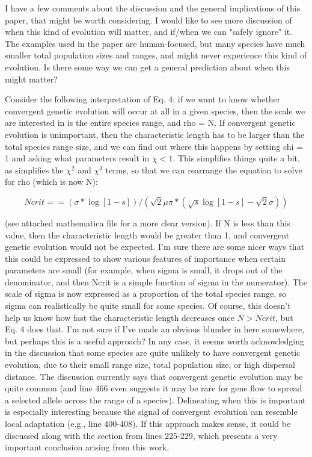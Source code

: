 \documentclass[12pt,letterpaper]{article}
\begin{document}
I have a few comments about the discussion and the general implications of this paper, that might be worth considering. I would like to see more discussion of when this kind of evolution will matter, and if/when we can "safely ignore" it. The examples used in the paper are human-focused, but many species have much smaller total population sizes and ranges, and might never experience this kind of evolution. Is there some way we can get a general prediction about when this might matter?

Consider the following interpretation of Eq. 4: if we want to know whether convergent genetic evolution will occur at all in a given species, then the scale we are interested in is the entire species range, and rho = N. If convergent genetic evolution is unimportant, then the characteristic length has to be larger than the total species range size, and we can find out where this happens by setting chi = 1 and asking what parameters result in $\chi < 1$. This simplifies things quite a bit, as simplifies the $\chi^2$ and $\chi^3$ terms, so that we can rearrange the equation to solve for rho (which is now N):

$$Ncrit == (\sigma * \log[1-s]) / (\sqrt{2}  \mu  \pi * (\sqrt{s} \log[1-s] - \sqrt{2}\sigma) )$$

(see attached mathematica file for a more clear version). If N is less than this value, then the characteristic length would be greater than 1, and convergent genetic evolution would not be expected. I'm sure there are some nicer ways that this could be expressed to show various features of importance when certain parameters are small (for example, when sigma is small, it drops out of the denominator, and then Ncrit is a simple function of sigma in the numerator). The scale of sigma is now expressed as a proportion of the total species range, so sigma can realistically be quite small for some species. Of course, this doesn't help us know how fast the characteristic length decreases once $N > Ncrit$, but Eq. 4 does that. I'm not sure if I've made an obvious blunder in here somewhere, but perhaps this is a useful approach? In any case, it seems worth acknowledging in the discussion that some species are quite unlikely to have convergent genetic evolution, due to their small range size, total population size, or high dispersal distance. The discussion currently says that convergent genetic evolution may be quite common (and line 466 even suggests it may be rare for gene flow to spread a selected allele across the range of a species). Delineating when this is important is especially interesting because the signal of convergent evolution can resemble local adaptation (e.g., line 400-408). If this approach makes sense, it could be discussed along with the section from lines 225-229, which presents a very important conclusion arising from this work.
\end{document}
